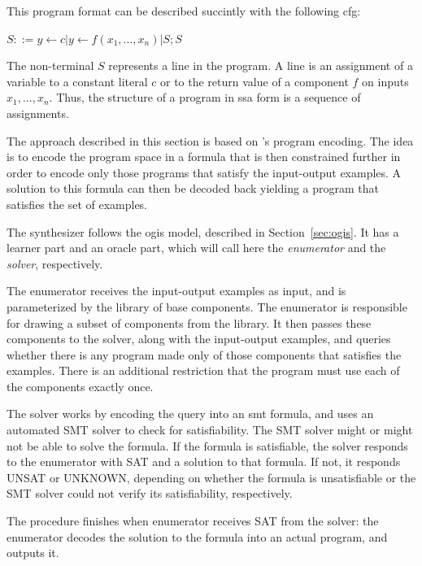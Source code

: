 
This program format can be described succintly with the following \gls{cfg}:

$S ::= y \leftarrow c | y \leftarrow f(x_1, ..., x_n) | S;S$

The non-terminal $S$ represents a line in the program. A line is an assignment
of a variable to a constant literal $c$ or to the return value of a component
$f$ on inputs $x_1, ..., x_n$. Thus, the structure of a program in \gls{ssa}
form is a sequence of assignments.

The approach described in this section is based on
\citeauthor{Jha:oracle:2010}'s program encoding. The idea is to encode the
program space in a formula that is then constrained further in order to encode
only those programs that satisfy the input-output examples. A solution to this
formula can then be decoded back yielding a program that satisfies the set of
examples.

The synthesizer follows the \gls{ogis} model, described in
Section~\ref{sec:ogis}. It has a learner part and an oracle part, which will
call here the \textit{enumerator} and the \textit{solver}, respectively.

The enumerator receives the input-output examples as input, and is parameterized
by the library of base components. The enumerator is responsible for drawing a
subset of components from the library. It then passes these components to the
solver, along with the input-output examples, and queries whether there is any
program made only of those components that satisfies the examples. There is an
additional restriction that the program must use each of the components exactly
once.


The solver works by encoding the query into an \gls{smt} formula, and uses an
automated SMT solver to check for satisfiability. The SMT solver might or might
not be able to solve the formula. If the formula is satisfiable, the solver
responds to the enumerator with SAT and a solution to that formula. If not, it
responds UNSAT or UNKNOWN, depending on whether the formula is unsatisfiable or
the SMT solver could not verify its satisfiability, respectively.

The procedure finishes when enumerator receives SAT from the solver: the
enumerator decodes the solution to the formula into an actual program, and
outputs it.

